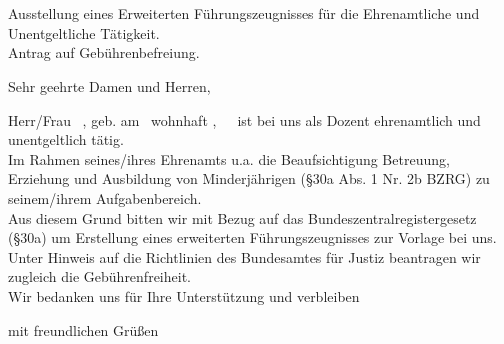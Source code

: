 \documentclass{bingoevletter}
\begin{document}
\begin{letter}{%
		\BehoerdeName\\
		\BehoerdeStr\\
		\BehoerdeOrt%
	}
	\opening{Ausstellung eines Erweiterten Führungszeugnisses für die Ehrenamtliche und Unentgeltliche Tätigkeit.\\ Antrag auf Gebührenbefreiung.}
	
	Sehr geehrte Damen und Herren,
	
	
	
	Herr/Frau \Vorname\ \Nachname , geb. am \GeburtsDatum\
	wohnhaft \Adresse,\ \PLZ\ \Ort\
	ist bei uns als Dozent ehrenamtlich und unentgeltlich tätig.\\
	
	
	Im Rahmen seines/ihres Ehrenamts u.a. die Beaufsichtigung Betreuung, Erziehung und Ausbildung von Minderjährigen (§30a Abs. 1 Nr. 2b BZRG) zu seinem/ihrem Aufgabenbereich.\\
	
	Aus diesem Grund bitten wir mit Bezug auf das Bundeszentralregistergesetz (§30a) um Erstellung eines erweiterten Führungszeugnisses zur Vorlage bei uns.\\
	Unter Hinweis auf die Richtlinien des Bundesamtes für Justiz beantragen wir zugleich die Gebührenfreiheit.\\
	Wir bedanken uns für Ihre Unterstützung und verbleiben\\
	
	
		
	
	\closing{mit freundlichen Grüßen}
\end{letter}	
\end{document}
